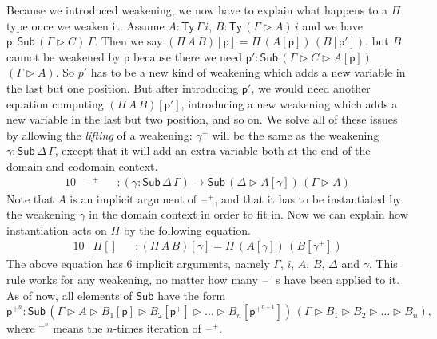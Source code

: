 \documentclass[a4paper,UKenglish]{article}
\newcommand{\ra}{\rightarrow}
\newcommand{\Ty}{\mathsf{Ty}}
\newcommand{\Sub}{\mathsf{Sub}}
\newcommand{\p}{\mathsf{p}}
\newcommand{\ext}{\mathop{\triangleright}}
\newcommand{\blank}{\mathord{\hspace{1pt}\text{--}\hspace{1pt}}} %
\begin{document}
Because we introduced weakening, we now have to explain what happens
to a $\Pi$ type once we weaken it. Assume $A : \Ty\,\Gamma\,i$,
$B:\Ty\,(\Gamma\ext A)\,i$ and we have $\p:\Sub\,(\Gamma\ext
C)\,\Gamma$. Then we say $(\Pi\,A\,B)[\p] = \Pi\,(A[\p])\,(B[\p'])$,
but $B$ cannot be weakened by $\p$ because there we need $\p' :
\Sub\,(\Gamma\ext C\ext A[\p])$ $(\Gamma\ext A)$. So $p'$ has to be a %
new kind of weakening which adds a new variable in the last but one
position. But after introducing $\p'$, we would need another equation computing $(\Pi\,A\,B)[\p']$,
introducing a new weakening which adds a new variable in the last but
two position, and so on. We solve all of these issues by allowing the
\emph{lifting} of a weakening: $\gamma^+$ will be the same as the
weakening $\gamma : \Sub\,\Delta\,\Gamma$, except that it will add an
extra variable both at the end of the domain and codomain
context.
\begin{alignat*}{10}
& \blank^+ && : (\gamma:\Sub\,\Delta\,\Gamma)\ra\Sub\,(\Delta\ext A[\gamma])\,(\Gamma\ext A)
\end{alignat*}
Note that $A$ is an implicit argument of $\blank^+$, and that it has
to be instantiated by the weakening $\gamma$ in the domain context in
order to fit in. Now we can explain how instantiation acts on $\Pi$ by
the following equation.
\begin{alignat*}{10}
& \Pi[] && : (\Pi\,A\,B)[\gamma] = \Pi\,(A[\gamma])\,(B[\gamma^+])
\end{alignat*}
The above equation has 6 implicit arguments, namely $\Gamma$, $i$,
$A$, $B$, $\Delta$ and $\gamma$.  This rule works for any weakening,
no matter how many $\blank^+$s have been applied to it. As of now, all
elements of $\Sub$ have the form
$
\p^{+^n} : \Sub\,(\Gamma\ext A\ext B_1[\p]\ext B_2[\p^+]\ext\dots\ext B_n[\p^{+^{n-1}}])\,(\Gamma\ext B_1\ext B_2\ext\dots\ext B_n),
$
where $^{+^n}$ means the $n$-times iteration of $\blank^+$.
\end{document}
